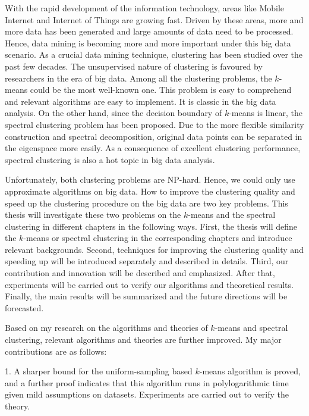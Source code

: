 
\begin{englishabstract}
	With the rapid development of the information technology, areas like Mobile Internet and Internet of Things are
growing fast. Driven by these areas, more and more data has been generated and large amounts of data need to be processed.
Hence, data mining is becoming more and more important under this big data scenario. As a crucial data mining technique,
clustering has been studied over the past few decades. The unsupervised nature of clustering is favoured by researchers in the era of big data. Among all the clustering problems, the $k$-means could be the most well-known one. This problem is easy to comprehend and relevant algorithms are easy to implement. It is classic in the big data analysis. On the other hand, since the decision boundary of $k$-means is linear, the spectral clustering problem has been proposed. Due to the more flexible similarity construction and spectral decomposition, original data points can be separated in the eigenspace more easily. As a consequence of excellent clustering performance, spectral clustering is also a hot topic in big data analysis.
	
Unfortunately, both clustering problems are NP-hard. Hence, we could only use approximate algorithms on big data. How to improve the clustering quality and speed up the clustering procedure on the big data are two key problems. This thesis will investigate these two problems on the $k$-means and the spectral clustering in different chapters in the following ways. First, the thesis will define the $k$-means or spectral clustering in the corresponding chapters and introduce relevant backgrounds. Second, techniques for improving the clustering quality and speeding up will be introduced separately and described in details. Third, our contribution and innovation will be described and emphasized. After that, experiments will be carried out to verify our algorithms and theoretical results. Finally, the main results will be summarized and the future directions will be forecasted.

Based on my research on the algorithms and theories of $k$-means and spectral clustering, relevant algorithms and theories are further improved. My major contributions are as follows:

1. A sharper bound for the uniform-sampling based $k$-means algorithm is proved, and a further proof indicates that this algorithm runs in polylogarithmic time given mild assumptions on datasets. Experiments are carried out to verify the theory.


\end{englishabstract}
